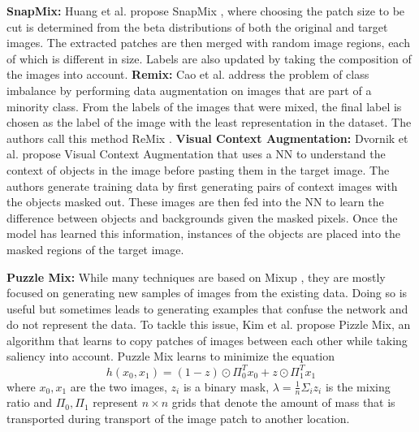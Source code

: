 \textbf{SnapMix: }
Huang et al. propose SnapMix \cite{huangSnapMixSemanticallyProportional2021}, where choosing the patch size to be cut is determined from the beta distributions of both the original and target images. The extracted patches are then merged with random image regions, each of which is different in size. Labels are also updated by taking the composition of the images into account.
\textbf{Remix: }
Cao et al. address the problem of class imbalance by performing data augmentation on images that are part of a minority class. From the labels of the images that were mixed, the final label is chosen as the label of the image with the least representation in the dataset. The authors call this method ReMix \cite{caoReMixImagetoImageTranslation2021}.
\textbf{Visual Context Augmentation: }
Dvornik et al. propose Visual Context Augmentation \cite{dvornikModelingVisualContext2018} that uses a NN to understand the context of objects in the image before pasting them in the target image. The authors generate training data by first generating pairs of context images with the objects masked out. These images are then fed into the NN to learn the difference between objects and backgrounds given the masked pixels. Once the model has learned this information, instances of the objects are placed into the masked regions of the target image.

\textbf{Puzzle Mix: }
While many techniques are based on Mixup \cite{zhangMixupEmpiricalRisk2018}, they are mostly focused on generating new samples of images from the existing data. Doing so is useful but sometimes leads to generating examples that confuse the network and do not represent the data. To tackle this issue, Kim et al. \cite{kimPuzzleMixExploiting2020} propose Pizzle Mix, an algorithm that learns to copy patches of images between each other while taking saliency into account. Puzzle Mix learns to minimize the equation $$h(x_{0}, x_{1}) = (1-z) \odot \Pi_{0}^{T}x_{0} + z \odot \Pi_{1}^{T}x_{1}$$ where $x_{0}, x_{1}$ are the two images, $z_{i}$ is a binary mask, $\lambda = \frac{1}{n}\Sigma_{i}z_{i}$ is the mixing ratio and $\Pi_{0}, \Pi_{1}$ represent $n \times n$ grids that denote the amount of mass that is transported during transport of the image patch to another location. 

